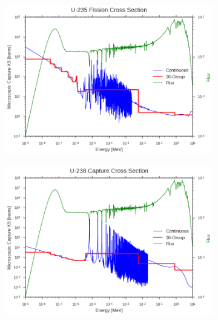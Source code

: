 \begin{figure}
\begin{subfigure}{.5\textwidth}
  \caption{}
  \label{fig:colorset-cells}
\end{subfigure}
\begin{subfigure}{.5\textwidth}
  \centering
  \includegraphics[width=\linewidth]{figures/intro/u235-fission-16}
  \caption{}
  \label{fig:assm-unique-neighbors}
\end{subfigure}
\begin{subfigure}{.5\textwidth}
  \centering
  \includegraphics[width=\linewidth]{figures/intro/u238-capture-16}
  \caption{}
  \label{fig:colorset-unique-neighbors}
\end{subfigure}
\begin{subfigure}{.5\textwidth}
  \centering

\end{subfigure}
\end{figure}
